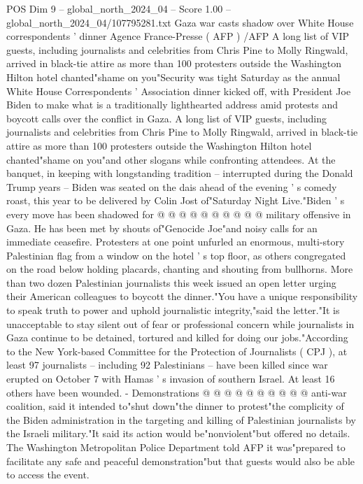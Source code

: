\begin{textsample}{POS Dim 9 – global\_north\_2024\_04 – Score 1.00 – global\_north\_2024\_04/107795281.txt}  \label{ex:f9_pos_182}
Gaza war casts shadow over White House correspondents ' dinner Agence France-Presse ( AFP ) /AFP A long list of VIP guests, including journalists and celebrities from Chris Pine to Molly Ringwald, arrived in black-tie attire as more than 100 protesters outside the Washington Hilton hotel chanted"shame on you"Security was tight Saturday as the annual White House Correspondents ' Association dinner kicked off, with President Joe Biden to make what is a traditionally lighthearted address amid protests and boycott calls over the conflict in Gaza.
A long list of VIP guests, including journalists and celebrities from Chris Pine to Molly Ringwald, arrived in black-tie attire as more than 100 protesters outside the Washington Hilton hotel chanted"shame on you"and other slogans while confronting attendees.
At the banquet, in keeping with longstanding tradition -- interrupted during the Donald Trump years -- Biden was seated on the dais ahead of the evening ' s comedy roast, this year to be delivered by Colin Jost of"Saturday Night Live."Biden ' s every move has been shadowed for @ @ @ @ @ @ @ @ @ @ military offensive in Gaza.
He has been met by shouts of"Genocide Joe"and noisy calls for an immediate ceasefire.
Protesters at one point unfurled an enormous, multi-story Palestinian flag from a window on the hotel ' s top floor, as others congregated on the road below holding placards, chanting and shouting from bullhorns.
More than two dozen Palestinian journalists this week issued an open letter urging their American colleagues to boycott the dinner."You have a unique responsibility to speak truth to power and uphold journalistic integrity,"said the letter."It is unacceptable to stay silent out of fear or professional concern while journalists in Gaza continue to be detained, tortured and killed for doing our jobs."According to the New York-based Committee for the Protection of Journalists ( CPJ ), at least 97 journalists -- including 92 Palestinians -- have been killed since war erupted on October 7 with Hamas ' s invasion of southern Israel.
At least 16 others have been wounded. - Demonstrations @ @ @ @ @ @ @ @ @ @ anti-war coalition, said it intended to"shut down"the dinner to protest"the complicity of the Biden administration in the targeting and killing of Palestinian journalists by the Israeli military."It said its action would be"nonviolent"but offered no details.
The Washington Metropolitan Police Department told AFP it was"prepared to facilitate any safe and peaceful demonstration"but that guests would also be able to access the event.

\end{textsample}
